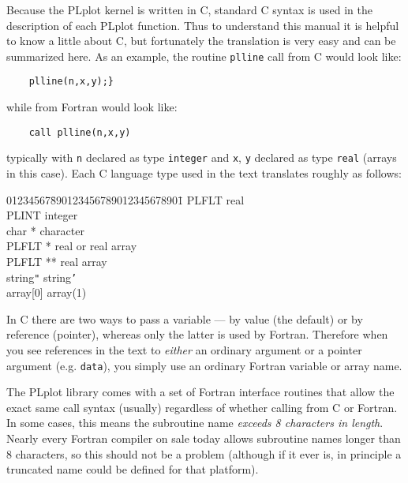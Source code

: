 Because the PLplot kernel is written in C, standard C syntax is used in the
description of each PLplot function.  Thus to understand this manual it is
helpful to know a little about C, but fortunately the translation is very
easy and can be summarized here.  As an example, the routine {\tt plline}
call from C would look like:
%
\begin{verbatim}
    plline(n,x,y);}
\end{verbatim}
%
while from Fortran would look like:
%
\begin{verbatim}
	call plline(n,x,y)
\end{verbatim}
%
typically with {\tt n} declared as type {\tt integer} and {\tt x}, {\tt y}
declared as type {\tt real} (arrays in this case).  Each C language type
used in the text translates roughly as follows:
\begin{tabbing}
01234567\=
	890123456789012345678901\=\kill
%
	\>PLFLT			\>real\\
	\>PLINT			\>integer\\
	\>char *		\>character\\
	\>PLFLT *		\>real or real array\\
	\>PLFLT **		\>real array\\
	string{\tt"}	string{\tt'}\\
	\>array[0]		\>array(1)\\
\end{tabbing}
In C there are two ways to pass a variable --- by value (the default) or by
reference (pointer), whereas only the latter is used by Fortran.
Therefore when you see references in the text to {\em either} an ordinary
argument or a pointer argument (e.g.  {\tt *data}), you simply use an
ordinary Fortran variable or array name.

The PLplot library comes with a set of Fortran interface routines that
allow the exact same call syntax (usually) regardless of whether calling
from C or Fortran.  In some cases, this means the subroutine name {\em
exceeds 8 characters in length}.  Nearly every Fortran compiler on sale
today allows subroutine names longer than 8 characters, so this should not
be a problem (although if it ever is, in principle a truncated name could
be defined for that platform).

